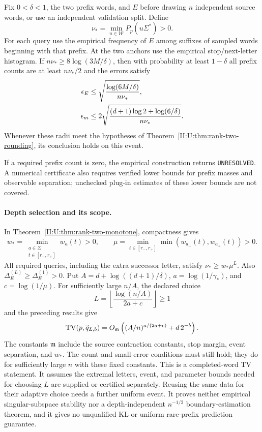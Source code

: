 \begin{corollary}
\label{II:U:cor:rank-two-sampling}
Fix $0<\delta<1$, the two prefix words, and $E$ before drawing $n$ independent source
words, or use an independent validation split. Define
\[
 \nu_*=\min_{u\in\mathcal W}P_p(u\Sigma^*)>0.
\]
For each query use the empirical frequency of $E$ among suffixes of
sampled words beginning with that prefix. At the two anchors use the
empirical stop/next-letter histogram. If
$n\nu_*\ge8\log(3M/\delta)$, then with probability at least $1-\delta$
all prefix counts are at least $n\nu_*/2$ and the errors satisfy
\begin{align}
 \epsilon_E&\le
 \sqrt{\frac{\log(6M/\delta)}{n\nu_*}},\notag\\
 \epsilon_m&\le
 2\sqrt{\frac{(d+1)\log2+\log(6/\delta)}{n\nu_*}}.
 \label{II:U:eq:rank-two-sample-radii}
\end{align}
Whenever these radii meet the hypotheses of
Theorem~\ref{II:U:thm:rank-two-rounding}, its conclusion holds on this event.
\end{corollary}

If a required prefix count is zero, the empirical construction returns
\texttt{UNRESOLVED}. A numerical certificate also requires verified
lower bounds for prefix masses and observable separation; unchecked
plug-in estimates of these lower bounds are not covered.

\paragraph{Depth selection and its scope.}
In Theorem~\ref{II:U:thm:rank-two-monotone}, compactness gives
\[
 w_*=\min_{\substack{a\in\Sigma\\t\in[r_-,r_+]}}w_a(t)>0,\qquad
 \mu=\min_{t\in[r_-,r_+]}\min(w_{a_-}(t),w_{a_+}(t))>0.
\]
All required queries, including the extra successor letter, satisfy
$\nu_*\ge w_*\mu^L$. Also
$\Delta_E^{(L)}\ge\Delta_E^{(1)}>0$.
Put $A=d+\log((d+1)/\delta)$,
$a=\log(1/\gamma_*)$, and $c=\log(1/\mu)$.
For sufficiently large $n/A$, the declared choice
\[
 L=\left\lfloor\frac{\log(n/A)}{2a+c}\right\rfloor\ge1
\]
and the preceding results give
\[
 \operatorname{TV}(p,\widetilde q_{L,b})
 =O_{\mathfrak m}\left((A/n)^{a/(2a+c)}+d\,2^{-b}\right).
\]
The constants $\mathfrak m$ include the source contraction constants,
stop margin, event separation, and $w_*$. The count and small-error
conditions must still hold; they do for sufficiently large $n$ with
these fixed constants. This is a completed-word TV statement.
It assumes the extremal letters, event, and parameter bounds needed
for choosing $L$ are supplied or certified separately. Reusing the
same data for their adaptive choice needs a further uniform event.
It proves neither empirical singular-subspace stability nor a
depth-independent $n^{-1/2}$ boundary-estimation theorem, and it gives
no unqualified KL or uniform rare-prefix prediction guarantee.

